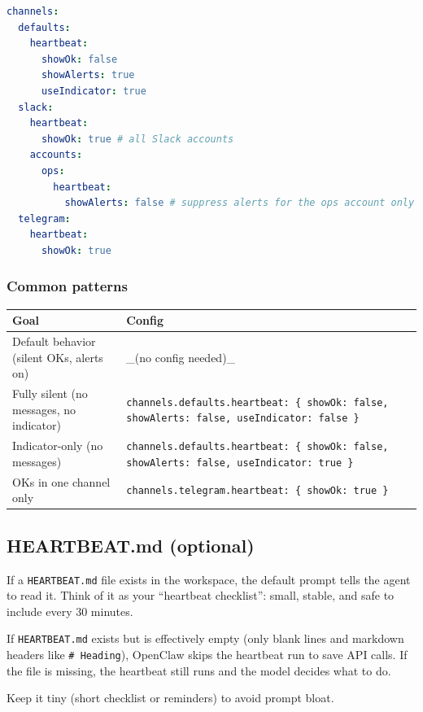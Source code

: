 \begin{lstlisting}[language=yaml]
channels:
  defaults:
    heartbeat:
      showOk: false
      showAlerts: true
      useIndicator: true
  slack:
    heartbeat:
      showOk: true # all Slack accounts
    accounts:
      ops:
        heartbeat:
          showAlerts: false # suppress alerts for the ops account only
  telegram:
    heartbeat:
      showOk: true
\end{lstlisting}


\subsubsection{Common patterns}



\begin{table}[h]
\centering
\small
\begin{tabular}{|l|l|}
\hline
Goal & Config \\
\hline
Default behavior (silent OKs, alerts on) & \_(no config needed)\_ \\
\hline
Fully silent (no messages, no indicator) & \texttt{channels.defaults.heartbeat: \{ showOk: false, showAlerts: false, useIndicator: false \}} \\
\hline
Indicator-only (no messages) & \texttt{channels.defaults.heartbeat: \{ showOk: false, showAlerts: false, useIndicator: true \}} \\
\hline
OKs in one channel only & \texttt{channels.telegram.heartbeat: \{ showOk: true \}} \\
\hline
\end{tabular}
\end{table}



\subsection{HEARTBEAT.md (optional)}


If a \texttt{HEARTBEAT.md} file exists in the workspace, the default prompt tells the
agent to read it. Think of it as your “heartbeat checklist”: small, stable, and
safe to include every 30 minutes.

If \texttt{HEARTBEAT.md} exists but is effectively empty (only blank lines and markdown
headers like \texttt{\# Heading}), OpenClaw skips the heartbeat run to save API calls.
If the file is missing, the heartbeat still runs and the model decides what to do.

Keep it tiny (short checklist or reminders) to avoid prompt bloat.

